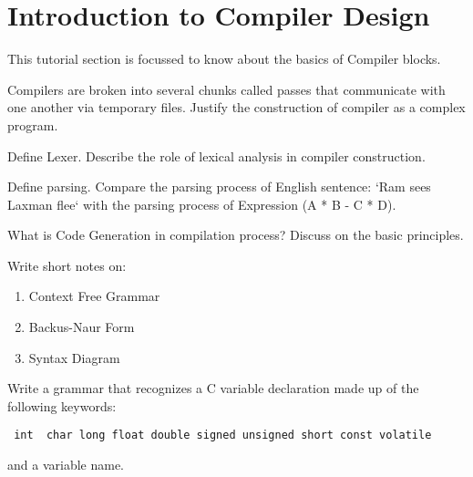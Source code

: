 \section{Introduction to Compiler Design}

This tutorial section is focussed to know about the basics of Compiler blocks.


\begin{question}
	 Compilers are broken into several chunks called passes that communicate with one another via temporary files. Justify the construction of compiler as a complex program.
\end{question}

\begin{question}
	Define Lexer. Describe the role of lexical analysis in compiler construction.
\end{question}

\begin{question}
	Define parsing. Compare the parsing process of English sentence: `Ram sees Laxman flee` with the parsing process of Expression (A * B - C * D).
\end{question}

\begin{question}
	What is Code Generation in compilation process? Discuss on the basic principles.
\end{question}

\begin{question}
	Write short notes on:
  \begin{enumerate}
    \item Context Free Grammar
    \item Backus-Naur Form
    \item Syntax Diagram
  \end{enumerate}
\end{question}

\begin{question}
Write a grammar that recognizes a C variable declaration made up of the following keywords:
\begin{verbatim}
 int  char long float double signed unsigned short const volatile
\end{verbatim}
and a variable name.
\end{question}

